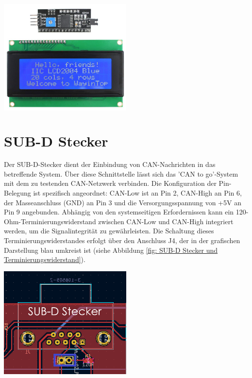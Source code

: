 \begin{centering}
  \includegraphics[width=0.5\textwidth]{img/Display.png}
  \label{fig: Display}
\end{centering}

\section{SUB-D Stecker}
\noindent Der SUB-D-Stecker dient der Einbindung von CAN-Nachrichten in das betreffende System. Über diese Schnittstelle lässt sich das 'CAN to go'-System mit dem zu testenden CAN-Netzwerk verbinden. Die Konfiguration der Pin-Belegung ist spezifisch angeordnet: CAN-Low ist an Pin 2, CAN-High an Pin 6, der Masseanschluss (GND) an Pin 3 und die Versorgungsspannung von +5V an Pin 9 angebunden. Abhängig von den systemseitigen Erfordernissen kann ein 120-Ohm-Terminierungswiderstand zwischen CAN-Low und CAN-High integriert werden, um die Signalintegrität zu gewährleisten. Die Schaltung dieses Terminierungswiderstandes erfolgt über den Anschluss J4, der in der grafischen Darstellung blau umkreist ist (siehe Abbildung \ref{fig: SUB-D Stecker und Terminierungswiderstand}).\\

\begin{centering}
\includegraphics[width=0.5\textwidth]{img/SUB_D_zuschaltbarer_widerstand.png}
\label{fig: SUB-D Stecker und Terminierungswiderstand}
\end{centering}

